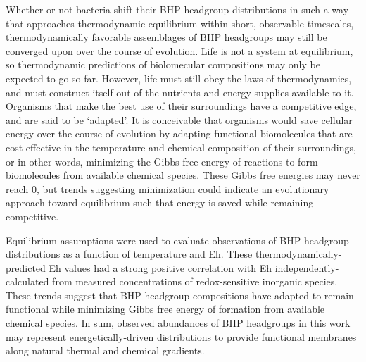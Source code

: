 Whether or not bacteria shift their BHP headgroup distributions in such a way that approaches thermodynamic equilibrium within short, observable timescales, thermodynamically favorable assemblages of BHP headgroups may still be converged upon over the course of evolution. Life is not a system at equilibrium, so thermodynamic predictions of biolomecular compositions may only be expected to go so far. However, life must still obey the laws of thermodynamics, and must construct itself out of the nutrients and energy supplies available to it. Organisms that make the best use of their surroundings have a competitive edge, and are said to be `adapted'. It is conceivable that organisms would save cellular energy over the course of evolution by adapting functional biomolecules that are cost-effective in the temperature and chemical composition of their surroundings, or in other words, minimizing the Gibbs free energy of reactions to form biomolecules from available chemical species. These Gibbs free energies may never reach 0, but trends suggesting minimization could indicate an evolutionary approach toward equilibrium such that energy is saved while remaining competitive.

Equilibrium assumptions were used to evaluate observations of BHP headgroup distributions as a function of temperature and Eh. These thermodynamically-predicted Eh values had a strong positive correlation with Eh independently-calculated from measured concentrations of redox-sensitive inorganic species. These trends suggest that BHP headgroup compositions have adapted to remain functional while minimizing Gibbs free energy of formation from available chemical species. In sum, observed abundances of BHP headgroups in this work may represent energetically-driven distributions to provide functional membranes along natural thermal and chemical gradients.



